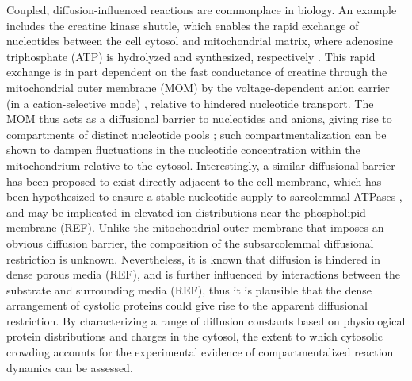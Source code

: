 Coupled, diffusion-influenced reactions are commonplace in biology. 
An example includes the creatine kinase shuttle, which enables the rapid exchange of nucleotides between the cell cytosol and mitochondrial matrix, where adenosine triphosphate (ATP) is hydrolyzed and synthesized, respectively \cite{vanBeek:2007gr}. 
This rapid exchange is in part dependent on the fast conductance of creatine through the mitochondrial outer membrane (MOM) by the voltage-dependent anion carrier (in a cation-selective mode) \cite{Anonymous:afLDblo3}, relative to hindered nucleotide transport.
The MOM thus acts as a diffusional barrier to nucleotides and anions, giving rise to compartments of distinct nucleotide pools \cite{Anonymous:afLDblo3}; such compartmentalization can be shown to dampen fluctuations in the nucleotide concentration within the mitochondrium relative to the cytosol. %
Interestingly, a similar diffusional barrier has been proposed to exist directly adjacent to the cell membrane, which has been hypothesized to ensure a stable nucleotide supply to sarcolemmal ATPases \cite{Alekseev:2011wc}, and may be implicated in elevated ion distributions near the phospholipid membrane (REF). %
Unlike the mitochondrial outer membrane that imposes an obvious diffusion barrier, the composition of the subsarcolemmal diffusional restriction is unknown. %
Nevertheless, it is known that diffusion is hindered in dense porous media (REF), and is further influenced by interactions between the substrate and surrounding media (REF), thus it is plausible that the dense arrangement of cystolic proteins could give rise to the apparent diffusional restriction. 
By characterizing a range of diffusion constants based on physiological protein distributions and charges in the cytosol, the extent to which cytosolic crowding accounts for the experimental evidence of compartmentalized reaction dynamics can be assessed.

